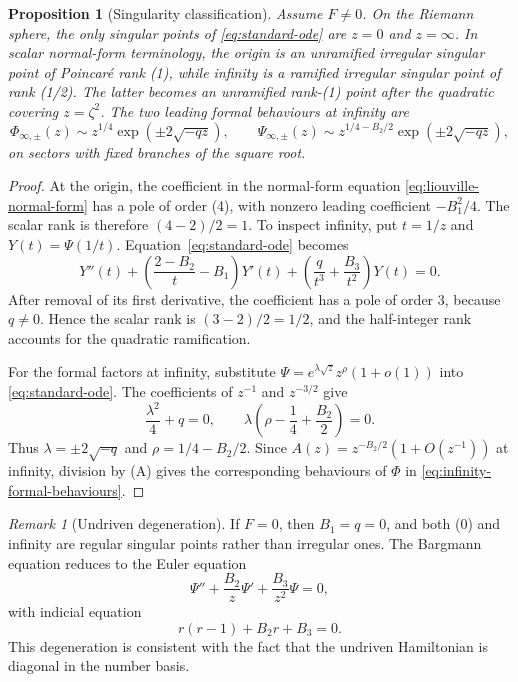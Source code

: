 \documentclass[11pt]{article}
\newtheorem{proposition}[theorem]{Proposition}
\theoremstyle{remark}
\newtheorem{remark}[theorem]{Remark}
\begin{document}
\begin{proposition}[Singularity classification]
\label{prop:singularity-classification}
Assume \(F\neq0\).  On the Riemann sphere, the only singular points of
\eqref{eq:standard-ode} are \(z=0\) and \(z=\infty\).  In scalar normal-form
terminology, the origin is an unramified irregular singular point of
Poincar\'e rank (1), while infinity is a ramified irregular singular point of
rank (1/2).  The latter becomes an unramified rank-(1) point after the
quadratic covering \(z=\zeta^2\).  The two leading formal behaviours at
infinity are
\begin{equation}
 \Phi_{\infty,\pm}(z)
 \sim z^{1/4}\exp\!\left(\pm2\sqrt{-qz}\right),
 \qquad
 \Psi_{\infty,\pm}(z)
 \sim z^{1/4-B_2/2}
       \exp\!\left(\pm2\sqrt{-qz}\right),
 \label{eq:infinity-formal-behaviours}
\end{equation}
on sectors with fixed branches of the square root.
\end{proposition}

\begin{proof}
At the origin, the coefficient in the normal-form equation
\eqref{eq:liouville-normal-form} has a pole of order (4), with nonzero leading
coefficient \(-B_1^2/4\).  The scalar rank is therefore
\((4-2)/2=1\).  To inspect infinity, put \(t=1/z\) and
\(Y(t)=\Psi(1/t)\).  Equation~\eqref{eq:standard-ode} becomes
\begin{equation}
 Y''(t)+\left(\frac{2-B_2}{t}-B_1\right)Y'(t)
 +\left(\frac{q}{t^3}+\frac{B_3}{t^2}\right)Y(t)=0.
 \label{eq:infinity-inverted}
\end{equation}
After removal of its first derivative, the coefficient has a pole of order
\(3\), because \(q\neq0\).  Hence the scalar rank is
\((3-2)/2=1/2\), and the half-integer rank accounts for the quadratic
ramification.

For the formal factors at infinity, substitute
\(\Psi=e^{\lambda\sqrt z}z^\rho(1+o(1))\) into
\eqref{eq:standard-ode}.  The coefficients of \(z^{-1}\) and \(z^{-3/2}\)
give
\begin{equation}
 \frac{\lambda^2}{4}+q=0,
 \qquad
 \lambda\left(\rho-\frac14+\frac{B_2}2\right)=0.
\end{equation}
Thus \(\lambda=\pm2\sqrt{-q}\) and
\(\rho=1/4-B_2/2\).  Since
\(A(z)=z^{-B_2/2}(1+O(z^{-1}))\) at infinity, division by (A) gives the
corresponding behaviours of \(\Phi\) in
\eqref{eq:infinity-formal-behaviours}.
\end{proof}

\begin{remark}[Undriven degeneration]
If \(F=0\), then \(B_1=q=0\), and both (0) and infinity are regular
singular points rather than irregular ones.  The Bargmann equation reduces to
the Euler equation
\begin{equation}
 \Psi''+\frac{B_2}{z}\Psi'+\frac{B_3}{z^2}\Psi=0,
\end{equation}
with indicial equation
\begin{equation}
 r(r-1)+B_2r+B_3=0.
\end{equation}
This degeneration is consistent with the fact that the undriven Hamiltonian
is diagonal in the number basis.
\end{remark}
\end{document}
